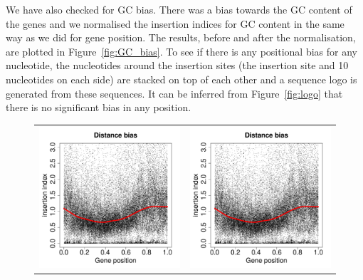 \documentclass[a4paper,10pt, twocolumn]{article}
\begin{document}
We have also checked for GC bias. There was a bias towards the GC content of the genes and we normalised the insertion indices for GC content in the same way as we did for gene position. The results, before and after the normalisation, are plotted in Figure~\ref{fig:GC_bias}. To see if there is any positional bias for any nucleotide, the nucleotides around the insertion sites (the insertion site and 10 nucleotides on each side) are stacked on top of each other and a sequence logo is generated from these sequences. It can be inferred from Figure~\ref{fig:logo} that there is no significant bias in any position.

\begin{figure}
\centering
\begin{tabular}{c c}
\includegraphics[scale=0.35, page=26]{biases-without-ends.pdf} &
\includegraphics[scale=0.35, page=27]{biases-without-ends.pdf}

\end{tabular}
\end{figure}
\end{document}

